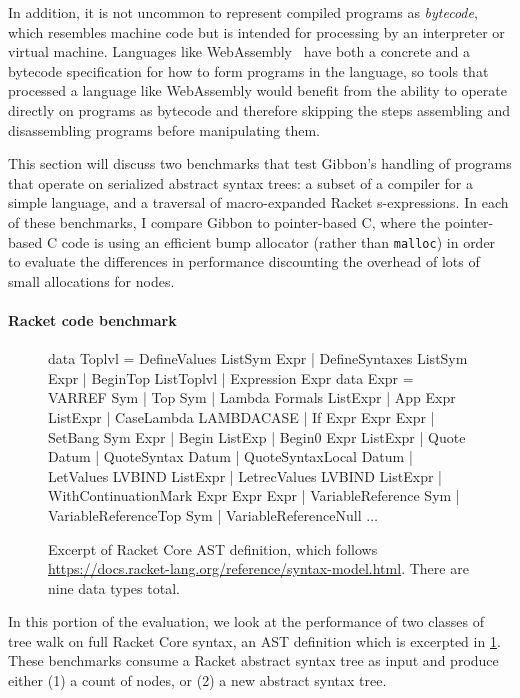 \documentclass[showabstract,showacknowledgments,showpreface,showdedication,school]{iuphd}
\theoremstyle{nonumberplain}
\begin{document}
In addition,
it is not uncommon to represent compiled programs as \emph{bytecode}, which
resembles machine code but is intended for processing by an interpreter or
virtual machine. Languages like WebAssembly~\cite{webassembly} have
both a concrete and a bytecode specification for how to form programs
in the language, so tools that processed a language like WebAssembly would benefit
from the ability to operate directly on programs as bytecode and therefore
skipping the steps assembling and disassembling programs before manipulating them.

This section will discuss two benchmarks that test Gibbon's handling of programs
that operate on serialized abstract syntax trees: a subset of a compiler for
a simple language, and a traversal of macro-expanded Racket s-expressions.
In each of these benchmarks, I compare Gibbon to pointer-based C, where the
pointer-based C code is using an efficient bump allocator (rather than \texttt{malloc})
in order to evaluate the differences in performance discounting the overhead of
lots of small allocations for nodes.

\paragraph{Racket code benchmark}

\begin{figure}[t]
      \footnotesize
  \begin{code}
data Toplvl = DefineValues ListSym Expr | DefineSyntaxes ListSym Expr
            | BeginTop ListToplvl       | Expression Expr
data Expr = VARREF Sym | Top Sym  | Lambda Formals ListExpr  | App Expr ListExpr
      | CaseLambda LAMBDACASE     | If Expr Expr Expr        | SetBang Sym Expr
      | Begin ListExp             | Begin0 Expr ListExpr     | Quote Datum
      | QuoteSyntax Datum         | QuoteSyntaxLocal Datum
      | LetValues LVBIND ListExpr | LetrecValues LVBIND ListExpr
      | WithContinuationMark Expr Expr Expr
      | VariableReference Sym | VariableReferenceTop Sym | VariableReferenceNull
$\ldots$
\end{code}
\normalsize
  \caption{Excerpt of Racket Core AST definition, which
   follows \url{https://docs.racket-lang.org/reference/syntax-model.html}.
   There are nine data types total.}\label{fig:racket-core}
\end{figure}

In this portion of the evaluation, we look at
the performance of two classes of tree walk
on full Racket Core syntax, an AST definition which is excerpted in \cref{fig:racket-core}.
These benchmarks consume a Racket abstract syntax tree as input and produce
either (1) a count of nodes, or (2) a new abstract syntax tree.
\end{document}
